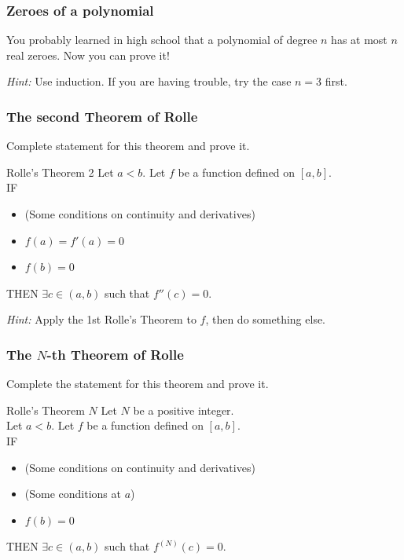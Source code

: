 \documentclass[14pt]{beamer}
\begin{document}
	\begin{frame}[t]
		\frametitle{Zeroes of a polynomial}

		You probably learned in high school that a polynomial of degree $n$ has at
		most $n$ real zeroes. Now you can prove it!

		\emph{Hint:} Use induction. If you are having trouble, try the case $n=3$
		first.
	\end{frame}

	\begin{frame}[t]
		\frametitle{The second Theorem of Rolle}

		Complete statement for this theorem and prove it.

		\vfill

		\begin{block}{Rolle's Theorem 2}
			Let $a<b$. Let $f$ be a function defined on $[a,b]$. \\ IF
			\begin{itemize}
				\item (Some conditions on continuity and derivatives)

				\item $\displaystyle f(a) = f'(a) =0$

				\item $\displaystyle f(b)=0$
			\end{itemize}
			THEN $\displaystyle \exists c \in (a,b)$ such that $\displaystyle f''(c)=0$.
		\end{block}

		\vfill

		\emph{Hint:} Apply the 1st Rolle's Theorem to $f$, then do something else.
	\end{frame}

	\begin{frame}[t]
		\frametitle{The $N$-th Theorem of Rolle}

		Complete the statement for this theorem and prove it.

		\begin{block}{Rolle's Theorem $N$}
			Let $N$ be a positive integer. \\ Let $a<b$. Let $f$ be a function defined
			on $[a,b]$. \\ IF
			\begin{itemize}
				\item (Some conditions on continuity and derivatives)

				\item (Some conditions at $a$)

				\item $\displaystyle f(b)=0$
			\end{itemize}
			THEN $\displaystyle \exists c \in (a,b)$ such that
			$\displaystyle f^{(N)}(c)=0$.
		\end{block}
	\end{frame}
\end{document}
